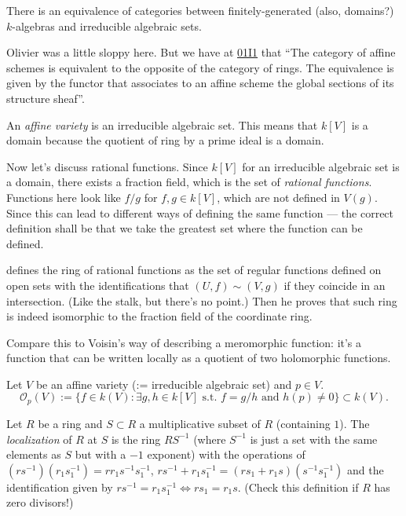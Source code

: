 \begin{lemma}
\label{lemma-algebras-and-varieties-category-equivalence}
There is an equivalence of categories between
finitely-generated (also, domains?) $k$-algebras
and irreducible algebraic sets.
\end{lemma}

\noindent
Olivier was a little sloppy here.
But we have at \href{https://stacks.math.columbia.edu/tag/01I1}{01I1}
that ``The category of affine schemes is equivalent 
to the opposite of the category of rings. 
The equivalence is given by the functor that 
associates to an affine scheme the global sections 
of its structure sheaf''.

An {\it affine variety} is an irreducible algebraic set.
This means that $k[V]$ is a domain
because the quotient of ring by a prime ideal is a domain.

\medskip\noindent
Now let's discuss rational functions.
Since $k[V]$ for an irreducible algebraic set is a domain,
there exists a fraction field, which is the
set of {\it rational functions}.
Functions here look like $f/g$ for $f,g \in k[V]$,
which are not defined in $V(g)$.
Since this can lead to different ways
of defining the same function
--- the correct definition shall be that
we take the greatest set where the function can be defined.

\begin{remark}
\label{remark-hartshorne-rational}
\cite{har} defines the ring of rational
functions as the set of regular functions defined
on open sets with the identifications that $(U,f)\sim(V,g)$ 
if they coincide in an intersection. (Like the stalk,
but there's no point.)
Then he proves that such ring is indeed
isomorphic to the fraction field of the
coordinate ring.
\end{remark}

Compare this to Voisin's way of describing
a meromorphic function:
it's a function that can be written locally
as a quotient of two holomorphic functions.

\begin{definition}
\label{definition-stalk}
Let $V$ be an affine variety (:= irreducible algebraic set)
and $p \in V$.
$$
\mathcal{O}_p(V)
:= \{f \in k(V):\exists g,h \in k[V]
\text{ s.t. }f=g/h \text{ and } h(p) \neq 0\}\subset k(V).
$$
\end{definition}

\begin{definition}
\label{definition-localization}
Let $R$ be a ring and $S \subset R$ 
a multiplicative subset of $R$ (containing $1$).
The {\it localization} of $R$ at $S$ 
is the ring $RS^{-1}$ 
(where $S^{-1}$ is just a set with
the same elements as $S$ but with a $-1$ exponent)
with the operations of $(rs^{-1})(r_1s_1^{-1})=rr_1s^{-1}s_1^{-1}$,
$rs^{-1}+r_1s_1^{-1}=(rs_1+r_1s)(s^{-1}s^{-1}_1)$
and the identification given by
$rs^{-1}=r_1s_1^{-1} \iff rs_1=r_1s$.
(Check this definition if $R$ has zero divisors!)
\end{definition}

